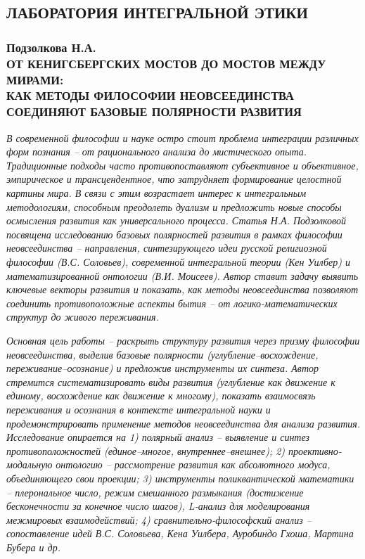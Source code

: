     \subsection{ЛАБОРАТОРИЯ ИНТЕГРАЛЬНОЙ ЭТИКИ}
    \label{subsec:podzolkova-ru}

    \subsubsection{Подзолкова Н.А. \\ ОТ КЕНИГСБЕРГСКИХ МОСТОВ ДО МОСТОВ МЕЖДУ МИРАМИ: \\ КАК МЕТОДЫ ФИЛОСОФИИ НЕОВСЕЕДИНСТВА \\ СОЕДИНЯЮТ БАЗОВЫЕ ПОЛЯРНОСТИ РАЗВИТИЯ}
    \label{subsubsec:podzolkova-title-ru}

    \textit{В современной философии и науке остро стоит проблема интеграции различных форм познания – от рационального анализа до мистического опыта. Традиционные подходы часто противопоставляют субъективное и объективное, эмпирическое и трансцендентное, что затрудняет формирование целостной картины мира. В связи с этим возрастает интерес к интегральным методологиям, способным преодолеть дуализм и предложить новые способы осмысления развития как универсального процесса. Статья Н.А. Подзолковой посвящена исследованию базовых полярностей развития в рамках философии неовсеединства – направления, синтезирующего идеи русской религиозной философии (В.С. Соловьев), современной интегральной теории (Кен Уилбер) и математизированной онтологии (В.И. Моисеев). Автор ставит задачу выявить ключевые векторы развития и показать, как методы неовсеединства позволяют соединить противоположные аспекты бытия – от логико-математических структур до живого переживания.}

    \textit{Основная цель работы – раскрыть структуру развития через призму философии неовсеединства, выделив базовые полярности (углубление–восхождение, переживание–осознание) и предложив инструменты их синтеза. Автор стремится систематизировать виды развития (углубление как движение к единому, восхождение как движение к многому), показать взаимосвязь переживания и осознания в контексте интегральной науки и продемонстрировать применение методов неовсеединства для анализа развития. Исследование опирается на 1) полярный анализ – выявление и синтез противоположностей (единое–многое, внутреннее–внешнее); 2) проективно-модальную онтологию – рассмотрение развития как абсолютного модуса, объединяющего свои проекции; 3) инструменты поликвантической математики – плерональное число, режим смешанного размыкания (достижение бесконечности за конечное число шагов), L-анализ для моделирования межмировых взаимодействий; 4) сравнительно-философский анализ – сопоставление идей В.С. Соловьева, Кена Уилбера, Ауробиндо Гхоша, Мартина Бубера и др.}

